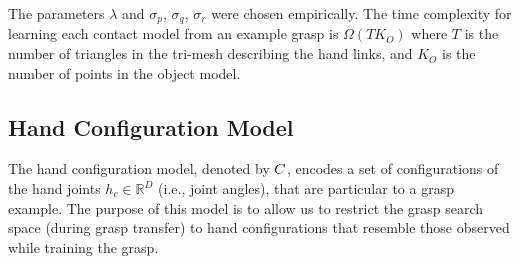 The parameters $\lambda$ and $\sigma_{p}$, $\sigma_{q}$, $\sigma_{r}$ were chosen empirically. The time complexity for learning each contact model from an example grasp is $\Omega(T K_O)$ where $T$ is the number of triangles in the tri-mesh describing the hand links, and $K_O$ is the number of points in the object model.


\subsection{Hand Configuration Model}

The hand configuration model, denoted by $C$, encodes a set of configurations of the hand joints $h_c \in \mathbb R^D$ (i.e., joint angles), that are particular to a grasp example. The purpose of this model is to allow us to restrict the grasp search space (during grasp transfer) to hand configurations that resemble those observed while training the grasp.

